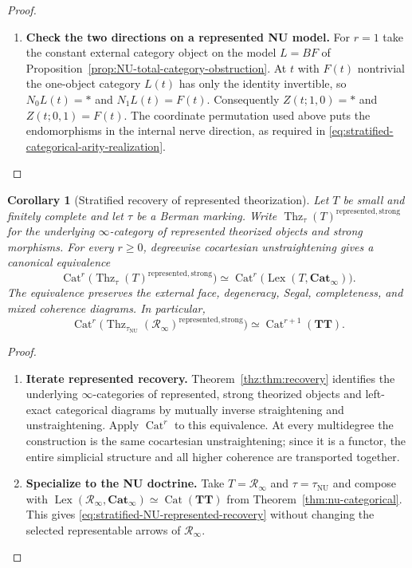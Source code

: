 \documentclass[oneside]{article}
\theoremstyle{plain}
\newtheorem{corollary}[theorem]{Corollary}
\theoremstyle{definition}
\theoremstyle{remark}
\newcommand{\Cat}{\mathbf{Cat}_{\infty}}
\newcommand{\Lex}{\operatorname{Lex}}
\newcommand{\NU}{\mathrm{NU}}
\newcommand{\RNU}{\mathcal R_{\infty}}
\newcommand{\TT}{\mathbf{TT}}
\newcommand{\Thz}{\operatorname{Thz}}
\begin{document}
\begin{proof}
\begin{enumerate}
\item \textbf{Check the two directions on a represented NU model.}
For $r=1$ take the constant external category object on the model
$L=BF$ of Proposition~\ref{prop:NU-total-category-obstruction}.
At $t$ with $F(t)$ nontrivial the one-object category $L(t)$ has
only the identity invertible, so $N_0L(t)=*$ and $N_1L(t)=F(t)$.
Consequently $Z(t;1,0)=*$ and $Z(t;0,1)=F(t)$.
The coordinate permutation used above puts the endomorphisms in
the internal nerve direction, as required in
\eqref{eq:stratified-categorical-arity-realization}.
\qedhere
\end{enumerate}
\end{proof}

\begin{corollary}[Stratified recovery of represented theorization]
\label{cor:stratified-represented-recovery}
Let $T$ be small and finitely complete and let $\tau$ be a Berman
marking.  Write $\Thz_\tau(T)^{\mathrm{represented,strong}}$ for
the underlying $\infty$-category of represented theorized objects
and strong morphisms.  For every $r\geq0$, degreewise cocartesian
unstraightening gives a canonical equivalence
\begin{equation}\label{eq:stratified-represented-recovery}
 \operatorname{Cat}^r\!\bigl(
   \Thz_\tau(T)^{\mathrm{represented,strong}}\bigr)
 \simeq
 \operatorname{Cat}^r\!\bigl(\Lex(T,\Cat)\bigr).
\end{equation}
The equivalence preserves the external face, degeneracy, Segal,
completeness, and mixed coherence diagrams.  In particular,
\begin{equation}\label{eq:stratified-NU-represented-recovery}
 \operatorname{Cat}^r\!\bigl(
   \Thz_{\tau_{\NU}}(\RNU)^{\mathrm{represented,strong}}\bigr)
 \simeq \operatorname{Cat}^{r+1}(\TT).
\end{equation}
\end{corollary}
\begin{proof}
\leavevmode
\begin{enumerate}
\item \textbf{Iterate represented recovery.}
Theorem~\ref{thz:thm:recovery} identifies the underlying
$\infty$-categories of represented, strong theorized objects and
left-exact categorical diagrams by mutually inverse straightening and
unstraightening.  Apply $\operatorname{Cat}^r$ to this equivalence.
At every multidegree the construction is the same cocartesian
unstraightening; since it is a functor, the entire simplicial
structure and all higher coherence are transported together.
\item \textbf{Specialize to the NU doctrine.}
Take $T=\RNU$ and $\tau=\tau_{\NU}$ and compose with
$\Lex(\RNU,\Cat)\simeq\operatorname{Cat}(\TT)$ from
Theorem~\ref{thm:nu-categorical}.  This gives
\eqref{eq:stratified-NU-represented-recovery} without changing the
selected representable arrows of $\RNU$.\qedhere
\end{enumerate}
\end{proof}
\end{document}
